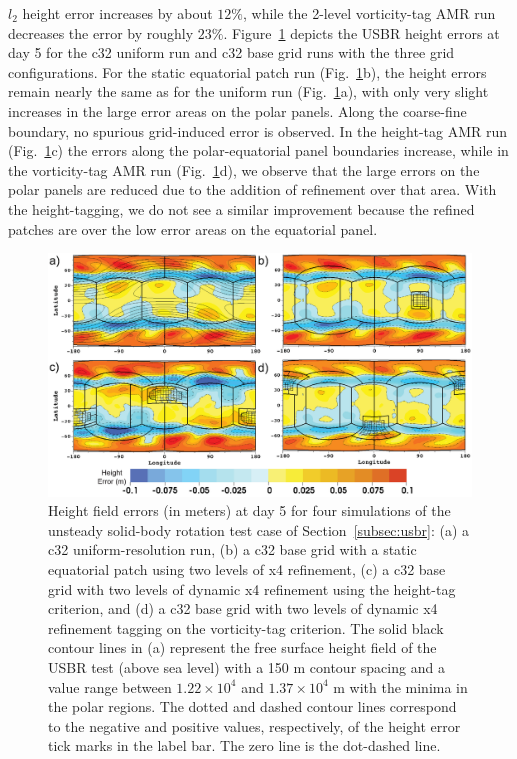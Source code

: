 $l_2$ height error increases by about $12\%$, while the 2-level
vorticity-tag AMR run decreases the error by roughly $23\%$.
Figure~\ref{fig:usbrherrplots} depicts the USBR height errors at day 5 for the
c32 uniform run and c32 base grid runs with the three grid
configurations.  For the static equatorial patch run
(Fig.~\ref{fig:usbrherrplots}b), the height errors remain nearly the same as
for the uniform run
(Fig.~\ref{fig:usbrherrplots}a), with only very slight increases in the large
error areas on the polar panels.  Along the coarse-fine boundary, no
spurious grid-induced error is observed.  In 
the height-tag AMR run (Fig.~\ref{fig:usbrherrplots}c) the errors along the
polar-equatorial panel boundaries increase, while in the vorticity-tag
AMR run
(Fig.~\ref{fig:usbrherrplots}d), we observe that the large errors on the polar
panels are reduced due to the addition of refinement over that area.
With the height-tagging, we do not see a similar improvement because the
refined patches are over the low error areas on the equatorial panel.
%
\begin{figure}
    \centerline{%
    \noindent
    \includegraphics[width=\textwidth]{Chap1/usbr_c32_herr.eps}}
    \caption{Height field errors (in meters) at day 5 for four
simulations of the unsteady solid-body rotation test case of
Section~\ref{subsec:usbr}:
    (a) a c32 uniform-resolution run, (b) a c32 base grid with a
    static equatorial patch using two levels of x4 refinement, (c) a c32
    base grid with two levels of dynamic x4 refinement using the
    height-tag criterion, and (d) a c32 base grid with two levels of
    dynamic x4 refinement tagging on the vorticity-tag criterion.  The
    solid black contour lines in (a) represent the free surface height field of the USBR
    test (above sea level) with a 150 m contour spacing and a value range between
    $1.22\times 10^{4}$ and $1.37\times 10^{4}$ m with the minima in the polar regions.  
    The dotted and dashed contour
    lines correspond to the negative and positive values, respectively,
    of the height error tick marks in the label bar.  The zero line is
    the dot-dashed line.  }%
    \label{fig:usbrherrplots}
\end{figure}
